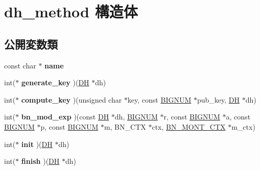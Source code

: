 \hypertarget{structdh__method}{}\section{dh\+\_\+method 構造体}
\label{structdh__method}
\subsection*{公開変数類}
\begin{DoxyCompactItemize}
\item 
\hypertarget{structdh__method_a87f4af9c60229836248385adca5caa21}{}const char $\ast$ {\bfseries name}\label{structdh__method_a87f4af9c60229836248385adca5caa21}

\item 
\hypertarget{structdh__method_aa044fbb69099292fac13ab075afbe8cd}{}int($\ast$ {\bfseries generate\+\_\+key} )(\hyperlink{structdh__st}{D\+H} $\ast$dh)\label{structdh__method_aa044fbb69099292fac13ab075afbe8cd}

\item 
\hypertarget{structdh__method_a1377905955b360c0113cc24643110c28}{}int($\ast$ {\bfseries compute\+\_\+key} )(unsigned char $\ast$key, const \hyperlink{structbignum__st}{B\+I\+G\+N\+U\+M} $\ast$pub\+\_\+key, \hyperlink{structdh__st}{D\+H} $\ast$dh)\label{structdh__method_a1377905955b360c0113cc24643110c28}

\item 
\hypertarget{structdh__method_af5261585e1ca4edaa2edd70a77f72274}{}int($\ast$ {\bfseries bn\+\_\+mod\+\_\+exp} )(const \hyperlink{structdh__st}{D\+H} $\ast$dh, \hyperlink{structbignum__st}{B\+I\+G\+N\+U\+M} $\ast$r, const \hyperlink{structbignum__st}{B\+I\+G\+N\+U\+M} $\ast$a, const \hyperlink{structbignum__st}{B\+I\+G\+N\+U\+M} $\ast$p, const \hyperlink{structbignum__st}{B\+I\+G\+N\+U\+M} $\ast$m, B\+N\+\_\+\+C\+T\+X $\ast$ctx, \hyperlink{structbn__mont__ctx__st}{B\+N\+\_\+\+M\+O\+N\+T\+\_\+\+C\+T\+X} $\ast$m\+\_\+ctx)\label{structdh__method_af5261585e1ca4edaa2edd70a77f72274}

\item 
\hypertarget{structdh__method_a672b716394908a7d67984290a41015c9}{}int($\ast$ {\bfseries init} )(\hyperlink{structdh__st}{D\+H} $\ast$dh)\label{structdh__method_a672b716394908a7d67984290a41015c9}

\item 
\hypertarget{structdh__method_adc4990f1d4887b7a495fa452d7ebfcf2}{}int($\ast$ {\bfseries finish} )(\hyperlink{structdh__st}{D\+H} $\ast$dh)\label{structdh__method_adc4990f1d4887b7a495fa452d7ebfcf2}


\end{DoxyCompactItemize}
